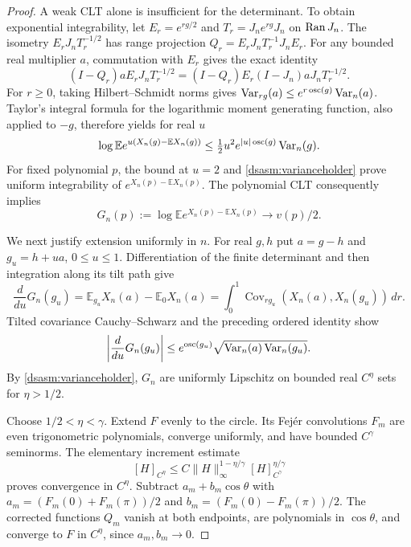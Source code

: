 \documentclass[11pt,letterpaper]{article}
\theoremstyle{remark}\newtheorem{remark}[theorem]{Remark}
\DeclareMathOperator{\Cov}{Cov}\DeclareMathOperator{\diag}{diag}
\begin{document}
\begin{proof}
A weak CLT alone is insufficient for the determinant. To obtain
exponential integrability, let $E_r=e^{rg/2}$ and
$T_r=J_ne^{rg}J_n$ on $\operatorname{Ran} J_n$. The isometry
$E_rJ_nT_r^{-1/2}$ has range projection
$Q_r=E_rJ_nT_r^{-1}J_nE_r$. For any bounded real multiplier $a$,
commutation with $E_r$ gives the exact identity
\[
 (I-Q_r)aE_rJ_nT_r^{-1/2}
   =(I-Q_r)E_r(I-J_n)aJ_nT_r^{-1/2}.
\]
For $r\ge0$, taking Hilbert--Schmidt norms gives
$\operatorname{Var}_{rg}(a)\le e^{r\operatorname{osc}(g)}\operatorname{Var}_n(a)$.
Taylor's integral formula for the logarithmic moment generating
function, also applied to $-g$, therefore yields for real $u$
\begin{equation}\label{dsasm:exponentialbound}
 \log\mathbb E e^{u(X_n(g)-\mathbb EX_n(g))}
 \le \tfrac12u^2e^{|u|\operatorname{osc}(g)}\operatorname{Var}_n(g).
\end{equation}
For fixed polynomial $p$, the bound at $u=2$ and
\eqref{dsasm:varianceholder} prove uniform integrability of
$e^{X_n(p)-\mathbb EX_n(p)}$. The polynomial CLT consequently implies
\begin{equation}\label{dsasm:polynomialG}
 G_n(p):=\log\mathbb E e^{X_n(p)-\mathbb EX_n(p)}\longrightarrow v(p)/2.
\end{equation}

We next justify extension uniformly in $n$. For real $g,h$ put
$a=g-h$ and $g_u=h+ua$, $0\le u\le1$. Differentiation of the
finite determinant and then integration along its tilt path give
\[
 \frac{d}{du}G_n(g_u)
  =\mathbb E_{g_u}X_n(a)-\mathbb E_0X_n(a)
  =\int_0^1\Cov_{rg_u}(X_n(a),X_n(g_u))\,dr.
\]
Tilted covariance Cauchy--Schwarz and the preceding ordered identity
show
\begin{equation}\label{dsasm:Gcontinuity}
 \left|\frac{d}{du}G_n(g_u)\right|
 \le e^{\operatorname{osc}(g_u)}
       \sqrt{\operatorname{Var}_n(a)\operatorname{Var}_n(g_u)}.
\end{equation}
By \eqref{dsasm:varianceholder}, $G_n$ are uniformly Lipschitz on bounded
real $C^\eta$ sets for $\eta>1/2$.

Choose $1/2<\eta<\gamma$. Extend $F$ evenly to the circle.
Its Fej\'er convolutions $F_m$ are even trigonometric polynomials,
converge uniformly, and have bounded $C^\gamma$ seminorms.
The elementary increment estimate
\[
 [H]_{C^\eta}\le C\|H\|_\infty^{1-\eta/\gamma}
                        [H]_{C^\gamma}^{\eta/\gamma}
\]
proves convergence in $C^\eta$. Subtract
$a_m+b_m\cos\theta$ with
$a_m=(F_m(0)+F_m(\pi))/2$ and
$b_m=(F_m(0)-F_m(\pi))/2$. The corrected functions $Q_m$ vanish
at both endpoints, are polynomials in $\cos\theta$, and converge
to $F$ in $C^\eta$, since $a_m,b_m\to0$.


\end{proof}
\end{document}
